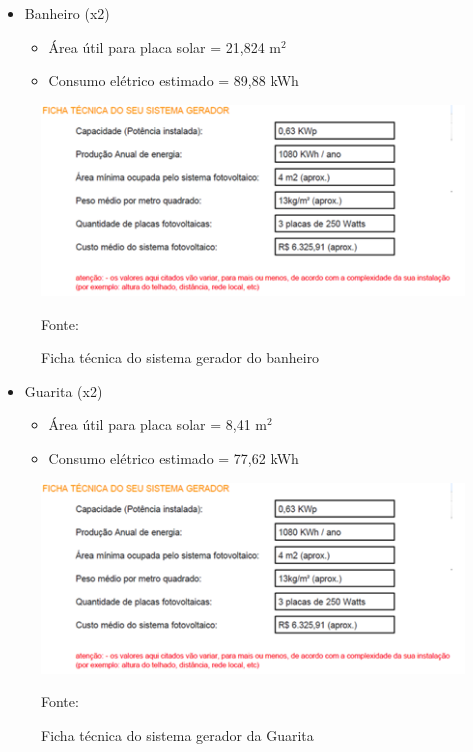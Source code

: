 \begin{itemize}
         \item Banheiro (x2)
	           \begin{itemize}
                       \item \'Area \'util para placa solar	=	21,824 m$^{2}$ 
                       \item Consumo el\'etrico estimado	=	89,88 kWh 
                  \end{itemize}	 
\end{itemize}

\begin{figure}[H]
	  \centering
	 \label{SistemaGeradorBanheiro}
	\includegraphics[keepaspectratio=true,scale=0.8]{figuras/SistemaGeradorBanheiro.png}
	\caption{Ficha t\'ecnica do sistema gerador do banheiro}
	\small{Fonte: \cite{PortalSolar}}
\end{figure}

\begin{itemize}
         \item Guarita (x2)
	           \begin{itemize}
                       \item \'Area \'util para placa solar	=	8,41 m$^{2}$ 
                       \item Consumo el\'etrico estimado	=	77,62 kWh  
                  \end{itemize}	
\end{itemize} 

 \begin{figure}[H]
	\centering
	\label{SistemaGeradorGuarita}
	\includegraphics[keepaspectratio=true,scale=0.8]{figuras/SistemaGeradorBanheiro.png}
	\caption{Ficha t\'ecnica do sistema gerador da Guarita}
	\small{Fonte: \cite{PortalSolar}}
\end{figure}

